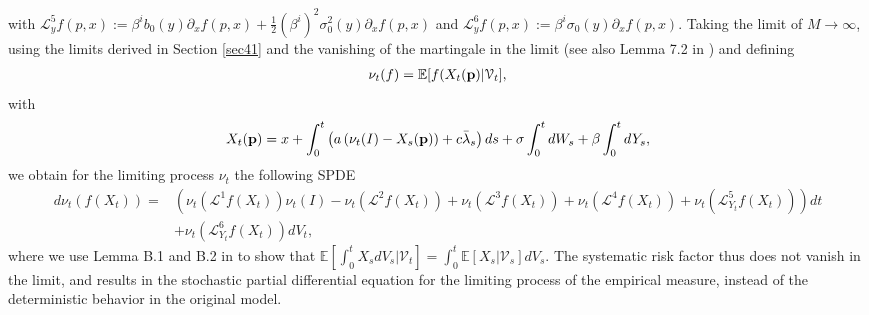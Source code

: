 \documentclass[10pt]{article}
\theoremstyle{plain}
\theoremstyle{definition}
\newcommand{\<}{\langle}
\renewcommand{\>}{\rangle}
\renewcommand{\(}{\left(}
\renewcommand{\)}{\right)}
\renewcommand{\[}{\left[}
\renewcommand{\]}{\right]}
\def \phi {{\varphi}}
\begin{document}
 with $\mathcal{L}^5_yf(p,x):=\beta^ib_0(y)\partial_x f(p,x) + \frac{1}{2}(\beta^i)^2\sigma_0^2(y)\partial_x f(p,x)$ and $\mathcal{L}^6_yf(p,x):=\beta^i\sigma_0(y)\partial_xf(p,x)$. Taking the limit of $M\rightarrow\infty$, using the limits derived in Section \ref{sec41} and the vanishing of the martingale in the limit (see also Lemma 7.2 in \cite{giesecke15}) and defining 
 \begin{align}
 \nu_t(f) = \mathbb{E}[f(X_t(\bold{p})|\mathcal{V}_t],
 \end{align}
  with 
  \begin{align}
  X_t(\bold{p})=x+\int_0^t\left(a\left(\nu_t(I)-X_s(\bold{p})\right)+c\bar\lambda_s\right)ds+\sigma \int_0^tdW_s+\beta\int_0^tdY_s, 
  \end{align}
  we obtain for the limiting process $\nu_t$ the following SPDE %
 \begin{align}
 d\nu_t(f(X_t)) = &\left(\nu_t(\mathcal{L}^1f(X_t))\nu_t(I)-\nu_t(\mathcal{L}^2f(X_t))+\nu_t(\mathcal{L}^3f(X_t))+\nu_t(\mathcal{L}^4f(X_t))+\nu_t(\mathcal{L}^5_{Y_t}f(X_t))\right)dt \\
 &+ \nu_t(\mathcal{L}^6_{Y_t}f(X_t))dV_t,
 \end{align}
 where we use Lemma B.1 and B.2 in \citet{giesecke15} to show that $\mathbb{E}\left[\int_0^tX_sdV_s|\mathcal{V}_t\right]=\int_0^t\mathbb{E}[X_s|\mathcal{V}_s]dV_s$.
The systematic risk factor thus does not vanish in the limit, and results in the stochastic partial differential equation for the limiting process of the empirical measure, instead of the deterministic behavior in the original model. 
\end{document}
